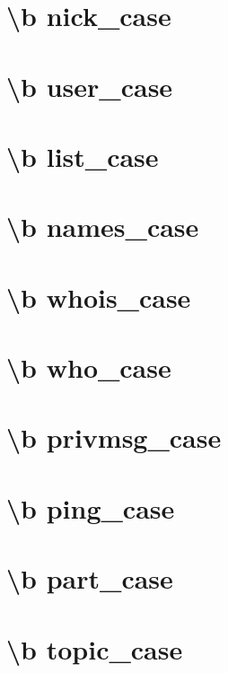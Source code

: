 \documentclass[twoside]{book}
\begin{document}
\chapter{\textbackslash{}b nick\-\_\-case}
\label{nick_case}
\hypertarget{nick_case}{}

\chapter{\textbackslash{}b user\-\_\-case}
\label{user_case}
\hypertarget{user_case}{}

\chapter{\textbackslash{}b list\-\_\-case}
\label{list_case}
\hypertarget{list_case}{}

\chapter{\textbackslash{}b names\-\_\-case}
\label{names_case}
\hypertarget{names_case}{}

\chapter{\textbackslash{}b whois\-\_\-case}
\label{whois_case}
\hypertarget{whois_case}{}

\chapter{\textbackslash{}b who\-\_\-case}
\label{who_case}
\hypertarget{who_case}{}

\chapter{\textbackslash{}b privmsg\-\_\-case}
\label{privmsg_case}
\hypertarget{privmsg_case}{}

\chapter{\textbackslash{}b ping\-\_\-case}
\label{ping_case}
\hypertarget{ping_case}{}

\chapter{\textbackslash{}b part\-\_\-case}
\label{part_case}
\hypertarget{part_case}{}

\chapter{\textbackslash{}b topic\-\_\-case}
\label{topic_case}
\hypertarget{topic_case}{}

\end{document}
